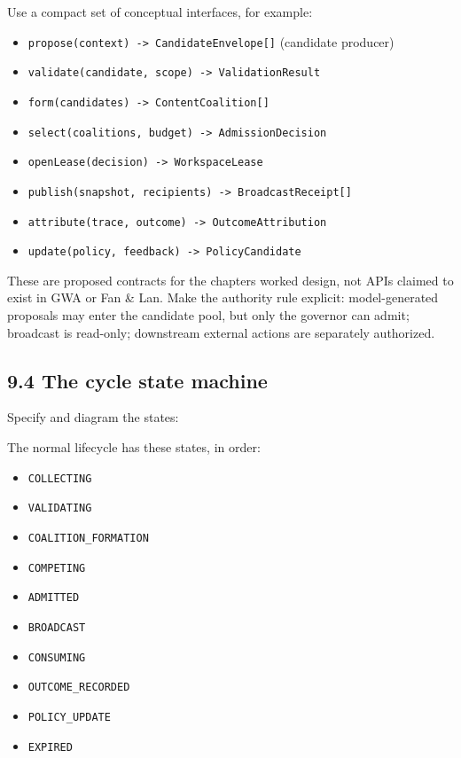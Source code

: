 Use a compact set of conceptual interfaces, for example:

\begin{itemize}
\tightlist
\item
  \texttt{propose(context)\ -\textgreater{}\ CandidateEnvelope{[}{]}} (candidate producer)
\item
  \texttt{validate(candidate,\ scope)\ -\textgreater{}\ ValidationResult}
\item
  \texttt{form(candidates)\ -\textgreater{}\ ContentCoalition{[}{]}}
\item
  \texttt{select(coalitions,\ budget)\ -\textgreater{}\ AdmissionDecision}
\item
  \texttt{openLease(decision)\ -\textgreater{}\ WorkspaceLease}
\item
  \texttt{publish(snapshot,\ recipients)\ -\textgreater{}\ BroadcastReceipt{[}{]}}
\item
  \texttt{attribute(trace,\ outcome)\ -\textgreater{}\ OutcomeAttribution}
\item
  \texttt{update(policy,\ feedback)\ -\textgreater{}\ PolicyCandidate}
\end{itemize}

These are proposed contracts for the chapter\textquotesingle s worked design, not APIs claimed to exist in GWA or Fan \& Lan. Make the authority rule explicit: model-generated proposals may enter the candidate pool, but only the governor can admit; broadcast is read-only; downstream external actions are separately authorized.

\subsection{9.4 The cycle state machine}\label{94-the-cycle-state-machine}

Specify and diagram the states:

The normal lifecycle has these states, in order:

\begin{itemize}
\tightlist
\item
  \texttt{COLLECTING}
\item
  \texttt{VALIDATING}
\item
  \texttt{COALITION\_FORMATION}
\item
  \texttt{COMPETING}
\item
  \texttt{ADMITTED}
\item
  \texttt{BROADCAST}
\item
  \texttt{CONSUMING}
\item
  \texttt{OUTCOME\_RECORDED}
\item
  \texttt{POLICY\_UPDATE}
\item
  \texttt{EXPIRED}
\end{itemize}

